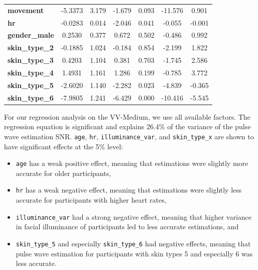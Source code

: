 \documentclass{article}
\begin{document}
\begin{table}[h!]
\begin{center}
\begin{tabular}{lcccccc}
\textbf{movement}                &      -5.3373  &        3.179     &    -1.679  &         0.093        &      -11.576    &        0.901     \\
\textbf{hr}                      &      -0.0283  &        0.014     &    -2.046  &         0.041        &       -0.055    &       -0.001     \\
\textbf{gender\_male}            &       0.2530  &        0.377     &     0.672  &         0.502        &       -0.486    &        0.992     \\
\textbf{skin\_type\_2}  			 &      -0.1885  &        1.024     &    -0.184  &         0.854        &       -2.199    &        1.822     \\
\textbf{skin\_type\_3}  			 &       0.4203  &        1.104     &     0.381  &         0.703        &       -1.745    &        2.586     \\
\textbf{skin\_type\_4}  			 &       1.4931  &        1.161     &     1.286  &         0.199        &       -0.785    &        3.772     \\
\textbf{skin\_type\_5}  			 &      -2.6020  &        1.140     &    -2.282  &         0.023        &       -4.839    &       -0.365     \\
\textbf{skin\_type\_6}  			 &      -7.9805  &        1.241     &    -6.429  &         0.000        &      -10.416    &       -5.545     \\
\bottomrule
\end{tabular}
\end{center}
\end{table}

For our regression analysis on the VV-Medium, we use all available factors.
The regression equation is significant and explains 26.4\% of the variance of the pulse wave estimation SNR.
\texttt{age}, \texttt{hr}, \texttt{illuminance\_var}, and \texttt{skin\_type\_x} are shown to have significant effects at the 5\% level:

\begin{itemize}
	\item \texttt{age} has a weak positive effect, meaning that estimations were slightly more accurate for older participants,
	\item \texttt{hr} has a weak negative effect, meaning that estimations were slightly less accurate for participants with higher heart rates,
	\item \texttt{illuminance\_var} had a strong negative effect, meaning that higher variance in facial illuminance of participants led to less accurate estimations, and
	\item \texttt{skin\_type\_5} and especially \texttt{skin\_type\_6} had negative effects, meaning that pulse wave estimation for participants with skin types 5 and especially 6 was less accurate.
\end{itemize}
\end{document}
